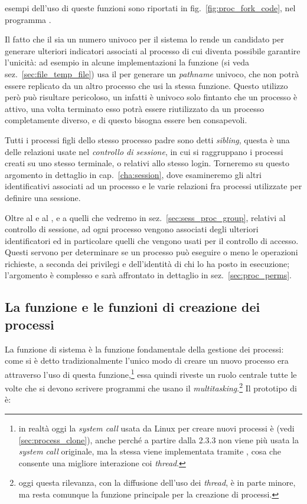 \noindent esempi dell'uso di queste funzioni sono riportati in
fig.~\ref{fig:proc_fork_code}, nel programma .

Il fatto che il  sia un numero univoco per il sistema lo rende un
candidato per generare ulteriori indicatori associati al processo di cui
diventa possibile garantire l'unicità: ad esempio in alcune implementazioni la
funzione  (si veda sez.~\ref{sec:file_temp_file}) usa il
 per generare un \textit{pathname} univoco, che non potrà essere
replicato da un altro processo che usi la stessa funzione. Questo utilizzo
però può risultare pericoloso, un  infatti è univoco solo fintanto
che un processo è attivo, una volta terminato esso potrà essere riutilizzato
da un processo completamente diverso, e di questo bisogna essere ben
consapevoli.

Tutti i processi figli dello stesso processo padre sono detti
\textit{sibling}, questa è una delle relazioni usate nel \textsl{controllo di
  sessione}, in cui si raggruppano i processi creati su uno stesso terminale,
o relativi allo stesso login. Torneremo su questo argomento in dettaglio in
cap.~\ref{cha:session}, dove esamineremo gli altri identificativi associati ad
un processo e le varie relazioni fra processi utilizzate per definire una
sessione.

Oltre al  e al , e a quelli che vedremo in
sez.~\ref{sec:sess_proc_group}, relativi al controllo di sessione, ad ogni
processo vengono associati degli ulteriori identificatori ed in particolare
quelli che vengono usati per il controllo di accesso.  Questi servono per
determinare se un processo può eseguire o meno le operazioni richieste, a
seconda dei privilegi e dell'identità di chi lo ha posto in esecuzione;
l'argomento è complesso e sarà affrontato in dettaglio in
sez.~\ref{sec:proc_perms}.


\subsection{La funzione  e le funzioni di creazione dei processi}
\label{sec:proc_fork}

La funzione di sistema  è la funzione fondamentale della gestione
dei processi: come si è detto tradizionalmente l'unico modo di creare un nuovo
processo era attraverso l'uso di questa funzione,\footnote{in realtà oggi la
  \textit{system call} usata da Linux per creare nuovi processi è 
  (vedi \ref{sec:process_clone}), anche perché a partire dalla 
  2.3.3 non viene più usata la \textit{system call} originale, ma la stessa
   viene implementata tramite , cosa che consente una
  migliore interazione coi \textit{thread}.} essa quindi riveste un ruolo
centrale tutte le volte che si devono scrivere programmi che usano il
\textit{multitasking}.\footnote{oggi questa rilevanza, con la diffusione
  dell'uso dei \textit{thread}, è in parte minore, ma  resta comunque
  la funzione principale per la creazione di processi.} Il prototipo di
 è:

